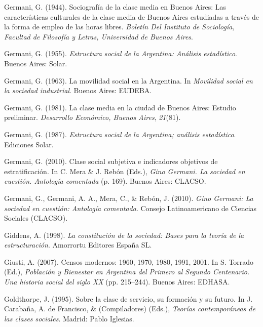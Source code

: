 \documentclass[
]{article}
\newlength{\cslhangindent}
\newlength{\cslentryspacingunit} %
\newenvironment{CSLReferences}[2] %
 {%
  \setlength{\parindent}{0pt}
  \ifodd #1
  \let\oldpar\par
  \def\par{\hangindent=\cslhangindent\oldpar}
  \fi
  \setlength{\parskip}{#2\cslentryspacingunit}
 }%
 {}
\begin{document}
\begin{CSLReferences}{1}{0}
\leavevmode{}%
Germani, G. (1944). Sociografía de la clase media en {Buenos} {Aires}: {Las} características culturales de la clase media de {Buenos} {Aires} estudiadas a través de la forma de empleo de las horas libres. \emph{Boletín Del Instituto de Sociología, Facultad de Filosofía y Letras, Universidad de Buenos Aires}.

\leavevmode{}%
Germani, G. (1955). \emph{Estructura social de la {Argentina}: {Análisis} estadístico}. Buenos Aires: Solar.

\leavevmode{}%
Germani, G. (1963). La movilidad social en la {Argentina}. In \emph{Movilidad social en la sociedad industrial}. Buenos Aires: EUDEBA.

\leavevmode{}%
Germani, G. (1981). La clase media en la ciudad de {Buenos} {Aires}: {Estudio} preliminar. \emph{Desarrollo Económico, Buenos Aires}, \emph{21}(81).

\leavevmode{}%
Germani, G. (1987). \emph{Estructura social de la {Argentina}; análisis estadístico}. Ediciones Solar.

\leavevmode{}%
Germani, G. (2010). Clase social subjetiva e indicadores objetivos de estratificación. In C. Mera \& J. Rebón (Eds.), \emph{Gino {Germani}. {La} sociedad en cuestión. {Antología} comentada} (p. 169). Buenos Aires: CLACSO.

\leavevmode{}%
Germani, G., Germani, A. A., Mera, C., \& Rebón, J. (2010). \emph{Gino {Germani}: La sociedad en cuestión: Antología comentada}. Consejo Latinoamericano de Ciencias Sociales (CLACSO).

\leavevmode{}%
Giddens, A. (1998). \emph{La constitución de la sociedad: Bases para la teoría de la estructuración}. Amorrortu Editores España SL.

\leavevmode{}%
Giusti, A. (2007). Censos modernos: 1960, 1970, 1980, 1991, 2001. In S. Torrado (Ed.), \emph{Población y {Bienestar} en {Argentina} del {Primero} al {Segundo} {Centenario}. {Una} historia social del siglo {XX}} (pp. 215--244). Buenos Aires: EDHASA.

\leavevmode{}%
Goldthorpe, J. (1995). Sobre la clase de servicio, su formación y su futuro. In J. Carabaña, A. de Francisco, \& (Compiladores) (Eds.), \emph{Teorías contemporáneas de las clases sociales}. Madrid: Pablo Iglesias.


\end{CSLReferences}
\end{document}
